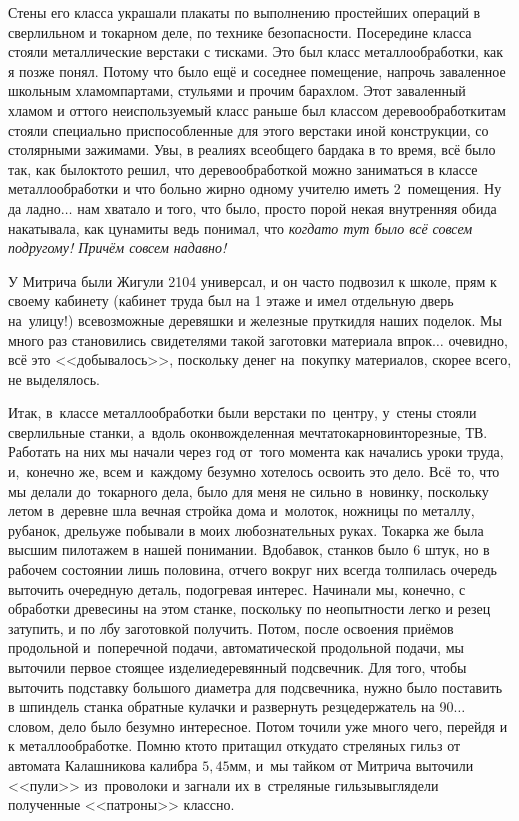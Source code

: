 Стены его класса украшали плакаты по выполнению простейших операций в сверлильном и токарном деле, по технике безопасности. Посередине класса стояли металлические верстаки с тисками. Это был класс металлообработки, как я позже понял. Потому что было ещё и соседнее помещение, напрочь заваленное школьным хламом\mdash партами, стульями и прочим барахлом. Этот заваленный хламом и оттого неиспользуемый класс раньше был классом деревообработки\mdash там стояли специально приспособленные для этого верстаки иной конструкции, со столярными зажимами. Увы, в реалиях всеобщего бардака в то время, всё было так, как было\mdash кто\sdash то решил, что деревообработкой можно заниматься в классе металлообработки и что больно жирно одному учителю иметь 2~помещения. Ну да ладно$\ldots$ нам хватало и того, что было, просто порой некая внутренняя обида накатывала, как цунами\mdash ты ведь понимал, что \textit{когда\sdash то тут было всё совсем по\sdash другому! Причём совсем надавно!} 

У Митрича были Жигули 2104 универсал, и он часто подвозил к школе, прям к своему кабинету (кабинет труда был на 1 этаже и имел отдельную дверь на~улицу!) всевозможные деревяшки и железные прутки\mdash для наших поделок. Мы много раз становились свидетелями такой заготовки материала впрок$\ldots$ очевидно, всё это <<добывалось>>, поскольку денег на~покупку материалов, скорее всего, не выделялось.

Итак, в~классе металлообработки были верстаки по~центру, у~стены стояли сверлильные станки, а~вдоль окон\mdash вожделенная мечта\mdash токарно\sdash винторезные, ТВ. Работать на них мы начали через год от~того момента как начались уроки труда, и,~конечно же, всем и~каждому безумно хотелось освоить это дело. Всё~то, что мы делали до~токарного дела, было для меня не сильно в~новинку, поскольку летом в~деревне шла вечная стройка дома и~молоток, ножницы по металлу, рубанок, дрель\mdash уже побывали в моих любознательных руках. Токарка же была высшим пилотажем в нашей понимании. Вдобавок, станков было 6 штук, но в рабочем состоянии лишь половина, отчего вокруг них всегда толпилась очередь выточить очередную деталь, подогревая интерес. Начинали мы, конечно, с обработки древесины на этом станке, поскольку по неопытности легко и резец затупить, и по лбу заготовкой получить. Потом, после освоения приёмов продольной и~поперечной подачи, автоматической продольной подачи, мы выточили первое стоящее изделие\mdash деревянный подсвечник. Для того, чтобы выточить подставку большого диаметра для подсвечника, нужно было поставить в шпиндель станка обратные кулачки и развернуть резцедержатель на 90\degree$\ldots$ словом, дело было безумно интересное. Потом точили уже много чего, перейдя и к металлообработке. Помню кто\sdash то притащил откуда\sdash то стреляных гильз от автомата Калашникова калибра $5,45$\thinspace мм, и~мы тайком от Митрича выточили <<пули>> из~проволоки и загнали их в~стреляные гильзы\mdash выглядели полученные <<патроны>> классно. 

